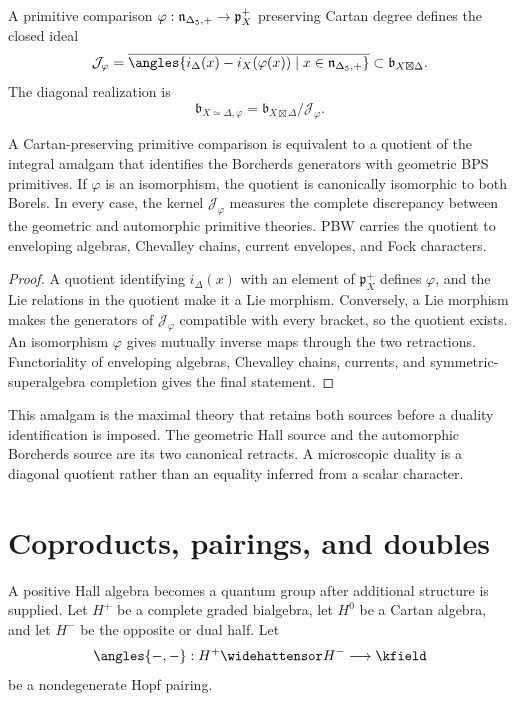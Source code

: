 \begin{definition}
A primitive comparison $\varphi:{\mathfrak n_{\Delta_5,+}}\to\mathfrak p_X^+$ preserving Cartan degree defines the closed ideal
\[
 \mathcal J_\varphi
 =\overline{\angles{
   i_\Delta(x)-i_X(\varphi(x))\mid x\in\nDelta
 }}
 \subset\mathfrak b_{X\boxtimes\Delta}.
\]
The diagonal realization is
\[
 \mathfrak b_{X\simeq\Delta,\varphi}
 =\mathfrak b_{X\boxtimes\Delta}/\mathcal J_\varphi.
\]
\end{definition}

\begin{theorem}
A Cartan-preserving primitive comparison is equivalent to a quotient of the integral amalgam that identifies the Borcherds generators with geometric BPS primitives.  If $\varphi$ is an isomorphism, the quotient is canonically isomorphic to both Borels.  In every case, the kernel $\mathcal J_\varphi$ measures the complete discrepancy between the geometric and automorphic primitive theories.  PBW carries the quotient to enveloping algebras, Chevalley chains, current envelopes, and Fock characters.
\end{theorem}
\begin{proof}
A quotient identifying $i_\Delta(x)$ with an element of $\mathfrak p_X^+$ defines $\varphi$, and the Lie relations in the quotient make it a Lie morphism.  Conversely, a Lie morphism makes the generators of $\mathcal J_\varphi$ compatible with every bracket, so the quotient exists.  An isomorphism $\varphi$ gives mutually inverse maps through the two retractions.  Functoriality of enveloping algebras, Chevalley chains, currents, and symmetric-superalgebra completion gives the final statement.
\end{proof}

This amalgam is the maximal theory that retains both sources before a duality identification is imposed.  The geometric Hall source and the automorphic Borcherds source are its two canonical retracts.  A microscopic duality is a diagonal quotient rather than an equality inferred from a scalar character.

\chapter{Coproducts, pairings, and doubles}
A positive Hall algebra becomes a quantum group after additional structure is supplied. Let $H^+$ be a complete graded bialgebra, let $H^0$ be a Cartan algebra, and let $H^-$ be the opposite or dual half. Let
\[
 \angles{-,-}:H^+\widehattensor H^-\longrightarrow\kfield
\]
be a nondegenerate Hopf pairing.

